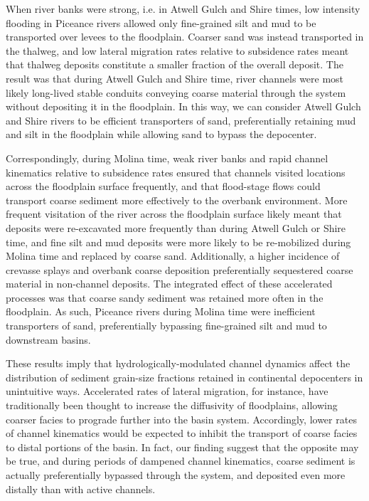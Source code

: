 \documentclass[draft]{compact_proposal}\usepackage[]{graphicx}\usepackage[]{color}
\begin{document}
When river banks were strong, i.e. in Atwell Gulch and Shire times, low intensity flooding in Piceance rivers allowed only fine-grained silt and mud to be transported over levees to the floodplain.
Coarser sand was instead transported in the thalweg, and low lateral migration rates relative to subsidence rates meant that thalweg deposits constitute a smaller fraction of the overall deposit.
The result was that during Atwell Gulch and Shire time, river channels were most likely long-lived stable conduits conveying coarse material through the system without depositing it in the floodplain.
In this way, we can consider Atwell Gulch and Shire rivers to be efficient transporters of sand, preferentially retaining mud and silt in the floodplain while allowing sand to bypass the depocenter.

Correspondingly, during Molina time, weak river banks and rapid channel kinematics relative to subsidence rates ensured that channels visited locations across the floodplain surface frequently, and that flood-stage flows could transport coarse sediment more effectively to the overbank environment.
More frequent visitation of the river across the floodplain surface likely meant that deposits were re-excavated more frequently than during Atwell Gulch or Shire time, and fine silt and mud deposits were more likely to be re-mobilized during Molina time and replaced by coarse sand.
Additionally, a higher incidence of crevasse splays and overbank coarse deposition preferentially sequestered coarse material in non-channel deposits.
The integrated effect of these accelerated processes was that coarse sandy sediment was retained more often in the floodplain.
As such, Piceance rivers during Molina time were inefficient transporters of sand, preferentially bypassing fine-grained silt and mud to downstream basins.

These results imply that hydrologically-modulated channel dynamics affect the distribution of sediment grain-size fractions retained in continental depocenters in unintuitive ways.
Accelerated rates of lateral migration, for instance, have traditionally been thought to increase the diffusivity of floodplains, allowing coarser facies to prograde further into the basin system.
Accordingly, lower rates of channel kinematics would be expected to inhibit the transport of coarse facies to distal portions of the basin.
In fact, our finding suggest that the opposite may be true, and during periods of dampened channel kinematics, coarse sediment is actually preferentially bypassed through the system, and deposited even more distally than with active channels.
\end{document}
